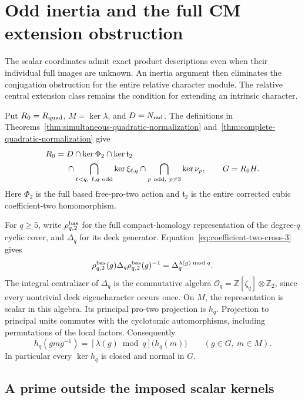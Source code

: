 \section{Odd inertia and the full CM extension obstruction}
\label{sec:general-odd-inertia}

The scalar coordinates admit exact product descriptions even when
their individual full images are unknown. An inertia argument then
eliminates the conjugation obstruction for the entire relative
character module. The relative central extension class remains
the condition for extending an intrinsic character.

Put \(R_0=R_{\rm quad}\), \(M=\ker\lambda\), and \(D=N_{\rm rad}\).
The definitions in
Theorems~\ref{thm:simultaneous-quadratic-normalization}
and~\ref{thm:complete-quadratic-normalization} give
\begin{equation}
 \begin{split}
 R_0={}&D\cap\ker\Phi_2\cap\ker\mathfrak t_2\\
 &\cap\bigcap_{\ell<q,\ \ell,q\ {\rm odd}}\ker\xi_{\ell,q}
 \cap\bigcap_{p\ {\rm odd},\ p\ne3}\ker\nu_p,
 \qquad G=R_0H.
 \end{split}
 \label{eq:general-cm-residual-intersection}
\end{equation}
Here \(\Phi_2\) is the full based free-pro-two action and
\(\mathfrak t_2\) is the entire corrected cubic coefficient-two
homomorphism.

For \(q\ge5\), write \(\rho^{\rm bas}_{q,2}\) for the full
compact-homology representation of the degree-\(q\) cyclic cover,
and \(\Delta_q\) for its deck generator.
Equation~\eqref{eq:coefficient-two-cross-3} gives
\[
 \rho^{\rm bas}_{q,2}(g)\Delta_q
       \rho^{\rm bas}_{q,2}(g)^{-1}
       =\Delta_q^{\lambda(g)\bmod q}.
\]
The integral centralizer of \(\Delta_q\) is the commutative
algebra \(\mathcal O_q=\mathbb Z[\zeta_q]\otimes\mathbb Z_2\),
since every nontrivial deck eigencharacter occurs once.
On \(M\), the representation is scalar in this algebra.
Its principal pro-two projection is \(h_q\).
Projection to principal units commutes with the cyclotomic
automorphisms, including permutations of the local factors.
Consequently
\begin{equation}
 h_q(gmg^{-1})=[\lambda(g)\bmod q]\bigl(h_q(m)\bigr)
                              \qquad(g\in G,\ m\in M).
 \label{eq:general-cm-scalar-equivariance}
\end{equation}
In particular every \(\ker h_q\) is closed and normal in \(G\).

\subsection{A prime outside the imposed scalar kernels}

